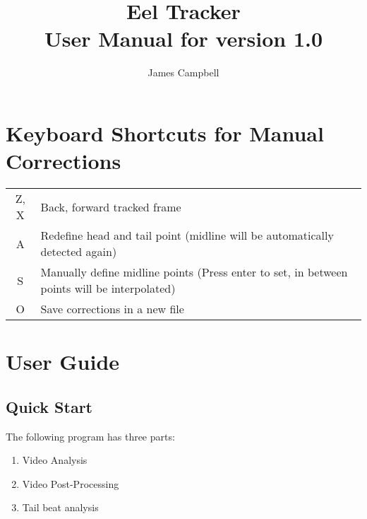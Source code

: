 \documentclass[11pt]{report}
\title{Eel Tracker\\ \Large User Manual for version 1.0}
\author{James Campbell}
\begin{document}
\maketitle
\tableofcontents

\newcommand{\screenshot}[2]{
	\begin{center}
		\texttt{[image: \#1]}
	\end{center}
}

\chapter{Keyboard Shortcuts for Manual Corrections}\label{keyboard}

\begin{table}[h!]
	\begin{center}
		\begin{tabular}{cl}
			\toprule
			Z, X & Back, forward tracked frame                                                                 \\
			A    & Redefine head and tail point (midline will be automatically detected again)                 \\
			S    & Manually define midline points (Press enter to set, in between points will be interpolated) \\
			O    & Save corrections in a new file                                                              \\

			\bottomrule
		\end{tabular}
	\end{center}
\end{table}

\chapter{User Guide}

\section{Quick Start}

The following program has three parts:

\begin{enumerate}
	\item Video Analysis
	\item Video Post-Processing
	\item Tail beat analysis
\end{enumerate}
\end{document}
